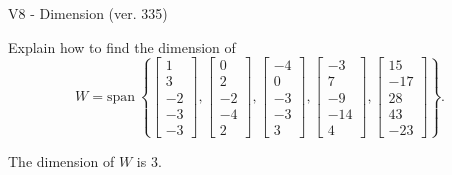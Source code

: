 \begin{exercise}
  \begin{exerciseTitle}V8 - Dimension (ver. 335)\end{exerciseTitle}
  \begin{exerciseStatement}
    Explain how to find the dimension of 
\[W=\mathrm{span}\ \left\{\left[\begin{array}{r}
1 \\
3 \\
-2 \\
-3 \\
-3
\end{array}\right] , \left[\begin{array}{r}
0 \\
2 \\
-2 \\
-4 \\
2
\end{array}\right] , \left[\begin{array}{r}
-4 \\
0 \\
-3 \\
-3 \\
3
\end{array}\right] , \left[\begin{array}{r}
-3 \\
7 \\
-9 \\
-14 \\
4
\end{array}\right] , \left[\begin{array}{r}
15 \\
-17 \\
28 \\
43 \\
-23
\end{array}\right]\right\}.\]



  \end{exerciseStatement}
  \begin{exerciseAnswer}
   The dimension of \(W\) is  \(3\).
  


  \end{exerciseAnswer}
\end{exercise}